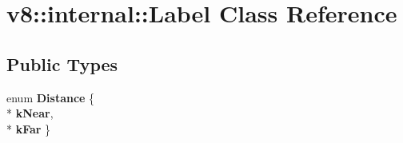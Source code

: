 \hypertarget{classv8_1_1internal_1_1_label}{}\section{v8\+:\+:internal\+:\+:Label Class Reference}
\label{classv8_1_1internal_1_1_label}
\subsection*{Public Types}
\begin{DoxyCompactItemize}
\item 
enum {\bfseries Distance} \{ \\*
{\bfseries k\+Near}, 
\\*
{\bfseries k\+Far}
 \}\hypertarget{classv8_1_1internal_1_1_label_aaf4d372e0d5c91bed4a6cfa0dbb10a5e}{}\label{classv8_1_1internal_1_1_label_aaf4d372e0d5c91bed4a6cfa0dbb10a5e}

\end{DoxyCompactItemize}
